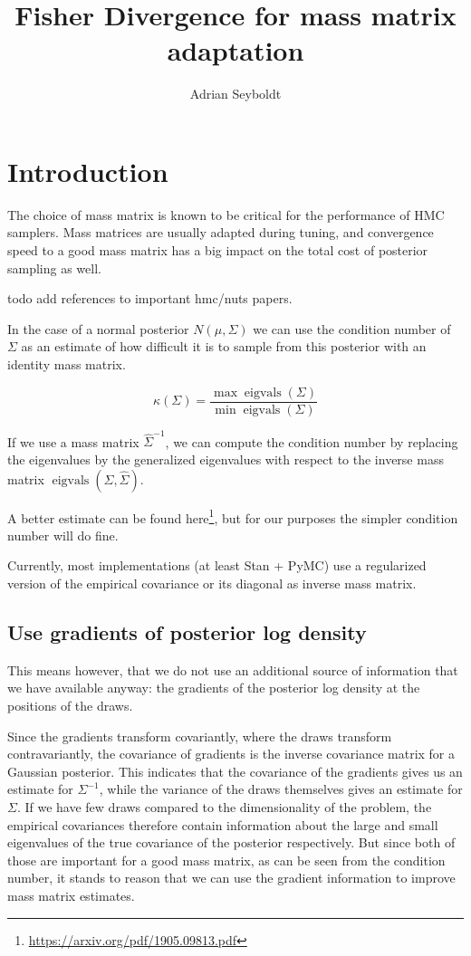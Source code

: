 \documentclass{scrartcl}
\title{Fisher Divergence for mass matrix adaptation}
\author{Adrian Seyboldt}
\DeclareMathOperator{\eigvals}{eigvals}
\begin{document}
\maketitle

\section{Introduction}

The choice of mass matrix is known to be critical for the performance of HMC
samplers. Mass matrices are usually adapted during tuning, and convergence
speed to a good mass matrix has a big impact on the total cost of posterior
sampling as well.

todo add references to important hmc/nuts papers.

In the case of a normal posterior $N(\mu, \Sigma)$ we can use the condition
number of $\Sigma$ as an estimate of how difficult it is to sample from
this posterior with an identity mass matrix.

\[
\kappa(\Sigma) = \frac{\max{\eigvals(\Sigma)}}{\min{\eigvals(\Sigma)}}
\]

If we use a mass matrix $\hat{\Sigma}^{-1}$, we can compute the
condition number by replacing the eigenvalues by the generalized eigenvalues
with respect to the inverse mass matrix $\eigvals(\Sigma, \hat\Sigma)$.

A better estimate can be found
here\footnote{\url{https://arxiv.org/pdf/1905.09813.pdf}}, but for our purposes
the simpler condition number will do fine.

Currently, most implementations (at least Stan + PyMC) use a regularized
version of the empirical covariance or its diagonal as inverse mass matrix.

\subsection{Use gradients of posterior log density}

This means however, that we do not use an additional source of information that
we have available anyway: the gradients of the posterior log density at the
positions of the draws.

Since the gradients transform covariantly, where the draws transform
contravariantly, the covariance of gradients is the inverse covariance matrix
for a Gaussian posterior. This indicates that the covariance of the gradients
gives us an estimate for $\Sigma^{-1}$, while the variance of the draws
themselves gives an estimate for $\Sigma$. If we have few draws compared to the
dimensionality of the problem, the empirical covariances therefore contain
information about the large and small eigenvalues of the true covariance of the
posterior respectively. But since both of those are important for a good mass
matrix, as can be seen from the condition number, it stands to reason that we
can use the gradient information to improve mass matrix estimates.
\end{document}
